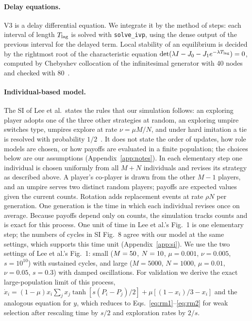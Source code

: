 \documentclass[11pt]{article}
\begin{document}
\paragraph{Delay equations.} V3 is a delay differential equation. We integrate it by the method of
steps: each interval of length $T_{\rm lag}$ is solved with \texttt{solve\_ivp}, using the dense
output of the previous interval for the delayed term. Local stability of an equilibrium is
decided by the rightmost root of the characteristic equation
$\det(\lambda I-J_0-J_1e^{-\lambda T_{\rm lag}})=0$, computed by Chebyshev collocation of the
infinitesimal generator with 40 nodes and checked with 80~\cite{breda2005pseudospectral}.

\paragraph{Individual-based model.} The SI of Lee et al.\ states the rules that our
simulation follows: an exploring player adopts one of the three other strategies at random, an
exploring umpire switches type, umpires explore at rate $\nu=\mu M/N$, and under hard imitation
a tie is resolved with probability $1/2$~\cite{lee2019social}. It does not state the order of
updates, how role models are chosen, or how payoffs are evaluated in a finite population; the
choices below are our assumptions (Appendix~\ref{app:notes}). In each elementary step one individual is chosen uniformly from all $M+N$ individuals and revises
its strategy as described above. A player's co-player is drawn from the other $M-1$ players, and
an umpire serves two distinct random players; payoffs are expected values given the current
counts. Rotation adds replacement events at rate $\rho N$ per generation. One generation is the
time in which each individual revises once on average. Because payoffs depend only on counts,
the simulation tracks counts and is exact for this process. One unit of time in Lee et al.'s
Fig.~1 is one elementary step; the numbers of cycles in SI Fig.~8 agree with our model at the
same settings, which supports this time unit (Appendix~\ref{app:si}). We use the two settings of Lee et
al.'s Fig.~1: small ($M=50$, $N=10$, $\mu=0.001$, $\nu=0.005$, $s=10^{10}$) with sustained
cycles, and large ($M=5000$, $N=1000$, $\mu=0.01$, $\nu=0.05$, $s=0.3$) with damped oscillations.
For validation we derive the exact large-population limit of this process,
$\dot x_i=(1-\mu)x_i\sum_j x_j\tanh[s(P_i-P_j)/2]+\mu[(1-x_i)/3-x_i]$ and the analogous equation for
$y$, which reduces to Eqs.~\eqref{eq:rm1}--\eqref{eq:rm2} for weak selection after rescaling time
by $s/2$ and exploration rates by $2/s$.
\end{document}
